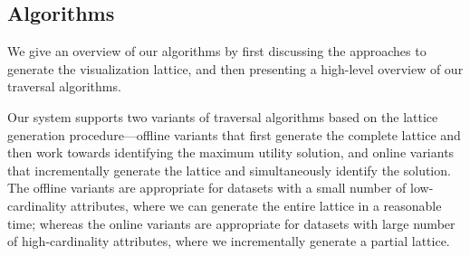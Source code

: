 \subsection{Algorithms\label{sec:algorithms}}
We give an overview of our algorithms by first discussing the approaches to generate the visualization lattice, and then presenting a high-level overview of our traversal algorithms.

 Our system supports two variants of traversal algorithms based on the lattice generation procedure---offline variants that first generate the complete lattice and then work towards identifying the maximum utility solution, and online variants that incrementally generate the lattice and simultaneously identify the solution. The offline variants are appropriate for datasets with a small number of low-cardinality attributes, where we can generate the entire lattice in a reasonable time; whereas the online variants are appropriate for datasets with large number of high-cardinality attributes, where we incrementally generate a partial lattice.


